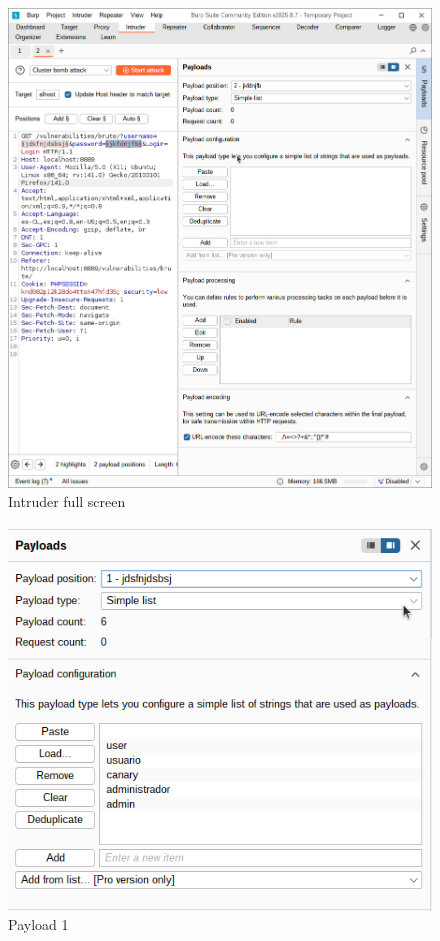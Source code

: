 \documentclass[letterpaper,12pt]{article}
\begin{document}
\begin{figure}
    \centering
    \includegraphics[width=1\linewidth]{identificaryobtenercamposburp/Captura desde 2025-10-01 23-20-22.png}
    \caption{Intruder full screen}
    \label{fig:intruder}
\end{figure}
\begin{figure}
    \centering
    \includegraphics[width=1\linewidth]{identificaryobtenercamposburp/Captura desde 2025-10-01 23-25-19.png}
    \caption{Payload 1}
    \label{fig:payload1}
\end{figure}
\end{document}
